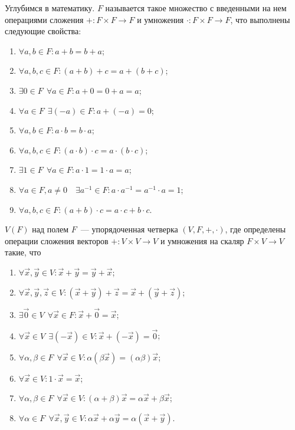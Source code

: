 	Углубимся в математику.  $F$ называется такое множество с введенными на нем операциями сложения $+:F \times F  \rightarrow F$ и умножения $\cdot: F \times F \rightarrow F$, что выполнены следующие свойства:
	\begin{enumerate}
		\item  $\forall a, b \in F: a+ b = b + a$;
		\item $\forall a, b, c \in F : (a + b) + c = a + ( b + c)$;
		\item  $\exists 0 \in F~~\forall a \in F: a  + 0 = 0 + a = a$;
		\item  $\forall a \in F ~~ \exists (-a) \in F: a + (-a) = 0$;
		\item  $\forall a, b \in F: a \cdot b = b \cdot a$;
		\item  $\forall a, b, c \in F : (a \cdot b) \cdot c = a \cdot ( b \cdot c)$;
		\item $\exists 1 \in F~~\forall a \in F: a \cdot 1 = 1 \cdot a = a$;
		\item  $\forall a \in F, a \not = 0 \quad \exists a^{-1} \in F: a \cdot a^{-1} = a^{-1} \cdot a = 1$;
		\item $\forall a, b, c \in F: (a + b) \cdot c = a \cdot c + b \cdot c$.
	\end{enumerate}
	
	 $V(F)$ над полем $F$~--- упорядоченная четверка $(V, F, + , \cdot)$, где определены операции сложения векторов $+ : V \times V \rightarrow V$ и умножения на скаляр $F \times V \rightarrow V$ такие, что
	\begin{enumerate}
		\item $\forall \vec{x}, \vec{y} \in V: \vec{x} + \vec{y} = \vec{y} + \vec{x}$;
		\item $ \forall \vec{x}, \vec{y}, \vec{z} \in V: (\vec{x} + \vec{y}) + \vec{z} =  \vec{x} + (\vec{y} + \vec{z})$;
		\item $\exists \vec{0} \in V~~\forall \vec{x} \in F: \vec{x} + \vec{0} = \vec{x}$;
		\item $\forall \vec{x} \in V~~\exists (-\vec{x}) \in V: \vec{x} + (-\vec{x}) = \vec{0}$;
		\item $\forall \alpha, \beta \in F~~\forall \vec{x} \in V: \alpha(\beta \vec{x}) =  (\alpha \beta) \vec{x}$;
		\item $\forall \vec{x} \in V: 1 \cdot \vec{x} = \vec{x}$;
		\item $\forall \alpha, \beta \in F~~\forall \vec{x} \in V: (\alpha + \beta) \vec{x} = \alpha \vec{x} + \beta \vec{x}$;
		\item $\forall \alpha \in F~~\forall \vec{x}, \vec{y} \in V: \alpha \vec{x} + \alpha \vec{y} = \alpha ( \vec{x} + \vec{y})$.
	\end{enumerate}
	

